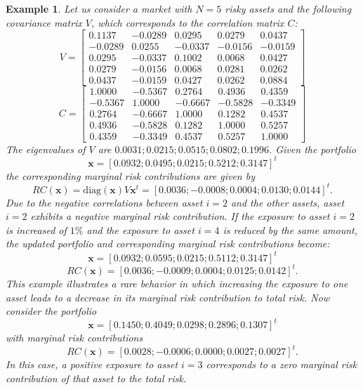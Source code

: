 \documentclass[preprint,11pt,authoryear]{elsarticle}
\newtheorem{example}{Example}%
\begin{document}
\begin{example}\label{es1}
Let us consider a market with $N=5$ risky assets and the following covariance matrix $V$, which corresponds to the correlation matrix $C$:
\[V = \left[\begin{array}{ccccc} 0.1137  & -0.0289  &  0.0295  &  0.0279  &  0.0437 \\
   -0.0289  &  0.0255 &  -0.0337 &  -0.0156 &  -0.0159 \\
    0.0295  & -0.0337 &   0.1002 &   0.0068 &   0.0427 \\
    0.0279  & -0.0156 &   0.0068 &   0.0281 &   0.0262 \\
    0.0437  & -0.0159 &   0.0427 &   0.0262 &   0.0884 \end{array}\right]
		\]
		\[
		C = \left[\begin{array}{ccccc} 1.0000  & -0.5367  &  0.2764  &  0.4936  &  0.4359 \\
   -0.5367  &  1.0000  & -0.6667 &  -0.5828  & -0.3349\\
    0.2764  & -0.6667  &  1.0000 &   0.1282  &  0.4537\\
    0.4936  & -0.5828  &  0.1282 &   1.0000  &  0.5257\\
    0.4359  & -0.3349  &  0.4537 &   0.5257  &  1.0000 \end{array}\right]
	\]
The eigenvalues of $V$ are $0.0031; 0.0215; 0.0515; 0.0802; 0.1996$. Given the portfolio 
\[
\mathbf{x} = [0.0932; 0.0495; 0.0215; 0.5212; 0.3147]^t
\] 
the corresponding marginal risk contributions are given by
\[
\textit{RC}(\mathbf{x}) = \textrm{diag}(\mathbf{x}) V \mathbf{x}^t = [0.0036; -0.0008; 0.0004; 0.0130; 0.0144]^t.
\] 
Due to the negative correlations between asset $i = 2$ and the other assets, asset $i = 2$ exhibits a negative marginal  risk contribution. If the exposure to asset $i = 2$ is increased of $1\%$ and the exposure to asset $i = 4$ is reduced by the same amount, the updated portfolio and corresponding marginal risk contributions become:
\[
\mathbf{x} = [0.0932; 0.0595; 0.0215; 0.5112; 0.3147]^t
\]  
\[
\textit{RC}(\mathbf{x}) = [0.0036; -0.0009; 0.0004; 0.0125; 0.0142]^t.
\]
This example illustrates a rare behavior in which increasing the exposure to one asset leads to a decrease in its marginal risk contribution to total risk.
Now consider the portfolio
\[
\mathbf{x} = [0.1450; 0.4049; 0.0298; 0.2896; 0.1307]^t
\] 
with marginal risk contributions 
\[
\textit{RC}(\mathbf{x}) = [0.0028; -0.0006; 0.0000; 0.0027; 0.0027]^t.
\]
In this case, a positive exposure to asset $i = 3$ corresponds to a zero marginal risk contribution of that asset to the total risk.   

\end{example}
\end{document}
